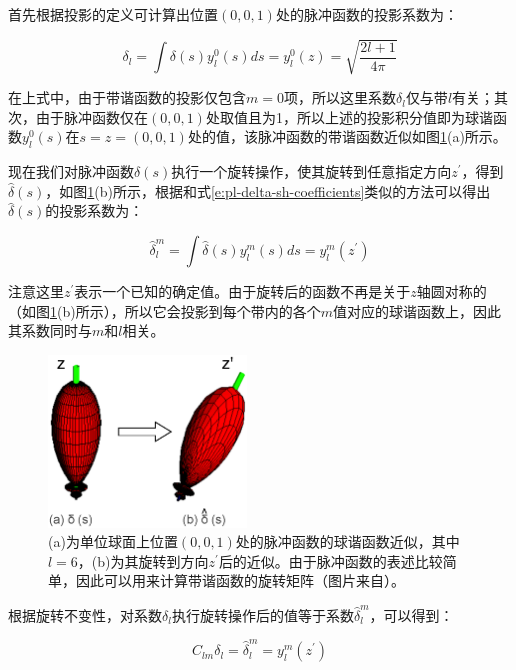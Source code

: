 首先根据投影的定义可计算出位置$(0,0,1)$处的脉冲函数的投影系数为：

\begin{equation}\label{e:pl-delta-sh-coefficients}
	\delta_l=\int\delta(s)y^{0}_{l}(s)ds=y^{0}_{l}(z)=\sqrt{\frac{2l+1}{4\pi}}
\end{equation}

在上式中，由于带谐函数的投影仅包含$m=0$项，所以这里系数$\delta_l$仅与带$l$有关；其次，由于脉冲函数仅在$(0,0,1)$处取值且为1，所以上述的投影积分值即为球谐函数$y^{0}_l(s)$在$s=z=(0,0,1)$处的值，该脉冲函数的带谐函数近似如图\ref{f:pl-zonal-rotation}(a)所示。

现在我们对脉冲函数$\delta(s)$执行一个旋转操作，使其旋转到任意指定方向$z^{'}$，得到$\hat{\delta}(s)$，如图\ref{f:pl-zonal-rotation}(b)所示，根据和式\ref{e:pl-delta-sh-coefficients}类似的方法可以得出$\hat{\delta}(s)$的投影系数为：

\begin{equation}
	\hat{\delta}^{m}_l=\int\hat{\delta}(s)y^{m}_{l}(s)ds=y^{m}_{l}(z^{'})
\end{equation}

注意这里$z^{'}$表示一个已知的确定值。由于旋转后的函数不再是关于$z$轴圆对称的（如图\ref{f:pl-zonal-rotation}(b)所示），所以它会投影到每个带内的各个$m$值对应的球谐函数上，因此其系数同时与$m$和$l$相关。

\begin{figure}
	\sidecaption
	\includegraphics[width=0.47\textwidth]{figures/prt/zonal-rotation}
	\caption{(a)为单位球面上位置$(0,0,1)$处的脉冲函数的球谐函数近似，其中$l=6$，(b)为其旋转到方向$z^{'}$后的近似。由于脉冲函数的表述比较简单，因此可以用来计算带谐函数的旋转矩阵（图片来自\cite{a:LocalDeformablePrecomputedRadianceTransfer}）。}
	\label{f:pl-zonal-rotation}
\end{figure}

根据旋转不变性，对系数$\delta_l$执行旋转操作后的值等于系数$\hat{\delta}^{m}_l$，可以得到：

\begin{equation}
	C_{lm}\delta_l=\hat{\delta}^{m}_{l}=y^{m}_{l}(z^{'})
\end{equation}


